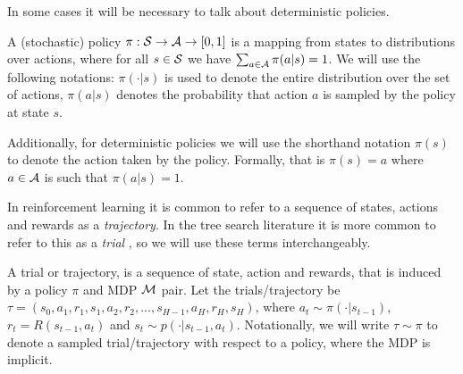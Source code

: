 
    In some cases it will be necessary to talk about deterministic policies. 

    \begin{defn}
        \label{def:policy}
        A \textnormal{(stochastic) policy} $\pi:\mathcal{S}\rightarrow \mathcal{A} \rightarrow [0,1]$ is a mapping from states to distributions over actions, where for all $s \in \mathcal{S}$ we have $\sum_{a\in\mathcal{A}} \pi(a|s) = 1$. We will use the following notations: $\pi(\cdot|s)$ is used to denote the entire distribution over the set of actions, $\pi(a|s)$ denotes the probability that action $a$ is sampled by the policy at state $s$. 

        Additionally, for \textnormal{deterministic policies} we will use the shorthand notation $\pi(s)$ to denote the action taken by the policy. Formally, that is $\pi(s)=a$ where $a\in\mathcal{A}$ is such that $\pi(a|s)=1$.
    \end{defn}


    In reinforcement learning it is common to refer to a sequence of states, actions and rewards as a \textit{trajectory}. In the tree search literature it is more common to refer to this as a \textit{trial} , so we will use these terms interchangeably.
    
    \begin{defn}
        \label{def:trajectory}
        \label{def:trial}
        A \textnormal{trial} or \textnormal{trajectory}, is a sequence of state, action and rewards, that is induced by a policy $\pi$ and MDP $\mathcal{M}$ pair. Let the trials/trajectory be $\tau = (s_0, a_1, r_1, s_1, a_2, r_2, ..., s_{H-1}, a_H, r_H, s_H)$, where $a_t \sim \pi(\cdot|s_{t-1})$, $r_t=R(s_{t-1},a_t)$ and $s_t \sim p(\cdot|s_{t-1},a_t)$. Notationally, we will write $\tau\sim\pi$ to denote a sampled trial/trajectory with respect to a policy, where the MDP is implicit.
    \end{defn}


